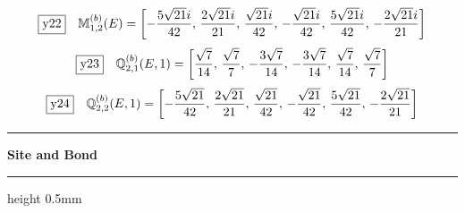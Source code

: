 \documentclass[fleqn,10pt,landscape]{jsarticle}
\begin{document}
\begin{dmath*}
\fbox{y22}\quad \mathbb{M}_{1,2}^{(b)}(E)=\left[ - \frac{5 \sqrt{21} i}{42},\, \frac{2 \sqrt{21} i}{21},\, \frac{\sqrt{21} i}{42},\, - \frac{\sqrt{21} i}{42},\, \frac{5 \sqrt{21} i}{42},\, - \frac{2 \sqrt{21} i}{21} \right]
\end{dmath*}
\begin{dmath*}
\fbox{y23}\quad \mathbb{Q}_{2,1}^{(b)}(E,1)=\left[ \frac{\sqrt{7}}{14},\, \frac{\sqrt{7}}{7},\, - \frac{3 \sqrt{7}}{14},\, - \frac{3 \sqrt{7}}{14},\, \frac{\sqrt{7}}{14},\, \frac{\sqrt{7}}{7} \right]
\end{dmath*}
\begin{dmath*}
\fbox{y24}\quad \mathbb{Q}_{2,2}^{(b)}(E,1)=\left[ - \frac{5 \sqrt{21}}{42},\, \frac{2 \sqrt{21}}{21},\, \frac{\sqrt{21}}{42},\, - \frac{\sqrt{21}}{42},\, \frac{5 \sqrt{21}}{42},\, - \frac{2 \sqrt{21}}{21} \right]
\end{dmath*}
\vspace{5mm}
\noindent \rule[0.5mm]{5mm}{0.5mm}\hspace{3mm}\textbf{Site and Bond}\hspace{3mm}\leaders\hrule height 0.5mm\hfill\kern0pt
\vspace{3mm}
\end{document}

